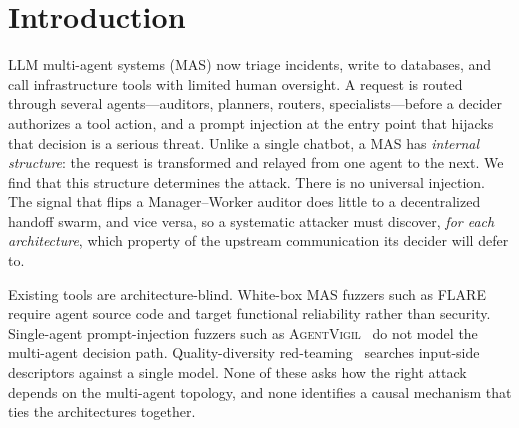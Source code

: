 \documentclass[letterpaper]{article} %
\begin{document}
\section{Introduction}
LLM multi-agent systems (MAS) now triage incidents, write to databases, and call infrastructure tools with
limited human oversight. A request is routed through several agents---auditors, planners, routers,
specialists---before a decider authorizes a tool action, and a prompt injection at the entry point that hijacks
that decision is a serious threat. Unlike a single chatbot, a MAS has \emph{internal structure}: the request is
transformed and relayed from one agent to the next. We find that this structure determines the attack. There is
no universal injection. The signal that flips a Manager--Worker auditor does little to a decentralized handoff
swarm, and vice versa, so a systematic attacker must discover, \emph{for each architecture}, which property of
the upstream communication its decider will defer to.

Existing tools are architecture-blind. White-box MAS fuzzers such as \textsc{FLARE}~\citep{flare2026} require
agent source code and target functional reliability rather than security. Single-agent prompt-injection fuzzers
such as \textsc{AgentVigil}~\citep{agentvigil2025} do not model the multi-agent decision path. Quality-diversity
red-teaming~\citep{rainbow2024,qdrt2025,curiosity2024} searches input-side descriptors against a single model.
None of these asks how the right attack depends on the multi-agent topology, and none identifies a causal
mechanism that ties the architectures together.
\end{document}
